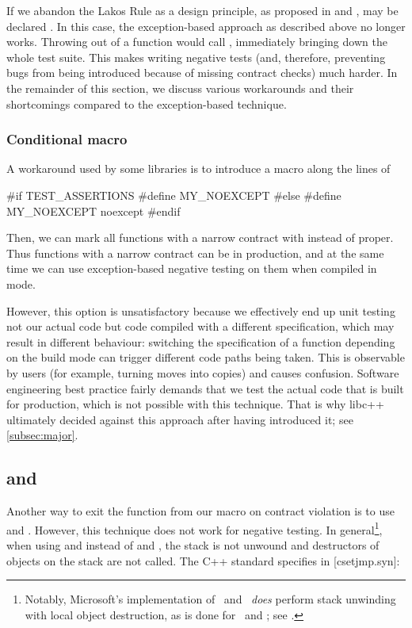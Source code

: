 If we abandon the Lakos Rule as a design principle, as proposed in \cite{P1656R2} and \cite{P2148R0},  may be declared . In this case, the exception-based approach as described above no longer works. Throwing  out of a  function would call , immediately bringing down the whole test suite. This makes writing negative tests (and, therefore, preventing bugs from being introduced because of missing contract checks) much harder. In the remainder of this section, we discuss various workarounds and their shortcomings compared to the exception-based technique.

\subsubsection{Conditional  macro}
\label{subsubsec:conditional}

A workaround used by some libraries is to introduce a macro along the lines of
\begin{codeblock}
#if TEST_ASSERTIONS
  #define MY_NOEXCEPT 
#else
  #define MY_NOEXCEPT noexcept
#endif
\end{codeblock}
Then, we can mark all functions with a narrow contract with  instead of  proper. Thus functions with a narrow contract can be  in production, and at the same time we can use exception-based negative testing on them when compiled in \mbox{} mode.

However, this option is  unsatisfactory because we effectively end up unit testing not our actual code but code compiled with a different specification, which may result in different behaviour: switching the  specification of a function depending on the build mode can trigger different code paths being taken. This is observable by users (for example, turning moves into copies) and causes confusion. Software engineering best practice fairly demands that we test the actual code that is built for production, which is not possible with this technique. That is why libc++ ultimately decided against this approach after having introduced it; see \ref{subsec:major}.

\subsection{ and }

Another way to exit the function from our  macro on contract violation is to use  and . However, this technique does not work for negative testing. In general\footnote{Notably, Microsoft's implementation of   and  \emph{does} perform stack unwinding with local object destruction, as is done for  and ; see \cite{MSVCDocLongjmp}.}, when using  and  instead of  and , the stack is not unwound and destructors of objects on the stack are not called. The C++ standard specifies in [csetjmp.syn]:

